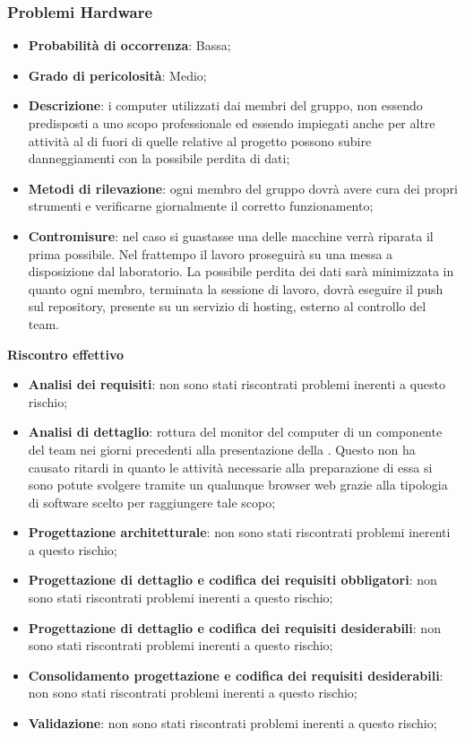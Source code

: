 		\subsubsection{Problemi Hardware} %
		\label{ssub:problemi_hardware}
			\begin{itemize}
				\item \textbf{Probabilità di occorrenza}: Bassa;
				\item \textbf{Grado di pericolosità}: Medio;
				\item \textbf{Descrizione}: i computer utilizzati dai membri del gruppo, non essendo predisposti a uno scopo professionale ed essendo impiegati anche per altre attività al di fuori di quelle relative al progetto possono subire danneggiamenti con la possibile perdita di dati;
				\item \textbf{Metodi di rilevazione}: ogni membro del gruppo dovrà avere cura dei propri strumenti e verificarne giornalmente il corretto funzionamento;
				\item \textbf{Contromisure}: nel caso si guastasse una delle macchine verrà riparata il prima possibile. Nel frattempo il lavoro proseguirà su una messa a disposizione dal laboratorio. La possibile perdita dei dati sarà minimizzata in quanto ogni membro, terminata la sessione di lavoro, dovrà eseguire il push sul repository, presente su un servizio di hosting, esterno al controllo del team.
			\end{itemize}
		\noindent
		\textbf{Riscontro effettivo}
			\begin{itemize}
				\item \textbf{Analisi dei requisiti}: non sono stati riscontrati problemi inerenti a questo rischio;
				\item \textbf{Analisi di dettaglio}: rottura del monitor del computer di un componente del team nei giorni precedenti alla presentazione della \RR. Questo non ha causato ritardi in quanto le attività necessarie alla preparazione di essa si sono potute svolgere tramite un qualunque browser web grazie alla tipologia di software scelto per raggiungere tale scopo;
				\item \textbf{Progettazione architetturale}: non sono stati riscontrati problemi inerenti a questo rischio;
				\item \textbf{Progettazione di dettaglio e codifica dei requisiti obbligatori}: non sono stati riscontrati problemi inerenti a questo rischio;
				\item \textbf{Progettazione di dettaglio e codifica dei requisiti desiderabili}: non sono stati riscontrati problemi inerenti a questo rischio;
				\item \textbf{Consolidamento progettazione e codifica dei requisiti desiderabili}: non sono stati riscontrati problemi inerenti a questo rischio;
				\item \textbf{Validazione}: non sono stati riscontrati problemi inerenti a questo rischio;
			\end{itemize}
		
